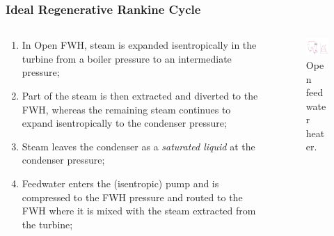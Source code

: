 \documentclass[10pt,compress]{beamer}
\begin{document}
\begin{frame}
 \frametitle{Ideal Regenerative Rankine Cycle}

  \begin{columns}
   \begin{column}[c]{0.5\linewidth}
    \begin{enumerate} %
     \item <1-> In Open FWH, steam is expanded isentropically in the turbine from a boiler pressure to an intermediate pressure;
     \item <2-> Part of the steam is then extracted and diverted to the FWH, whereas the remaining steam continues to expand isentropically to the condenser pressure;
      \item <3-> Steam leaves the condenser as a {\it saturated liquid} at the condenser pressure; 
      \item <4-> Feedwater enters the (isentropic) pump and is compressed to the FWH pressure and routed to the FWH where it is mixed with the steam extracted from the turbine;
    \end{enumerate} 
   \end{column}

   \begin{column}[c]{0.5\linewidth} 
     \begin{figure}%
     \begin{center}
      \includegraphics[width=6.25cm,clip]{./Pics/Regenerative_Rankine_Cycle_OpenFWH}
      \caption{\scriptsize Open feedwater heater.} 
     \end{center}
    \end{figure}  
   \end{column}
  \end{columns}
 \normalsize
\end{frame}
\end{document}
